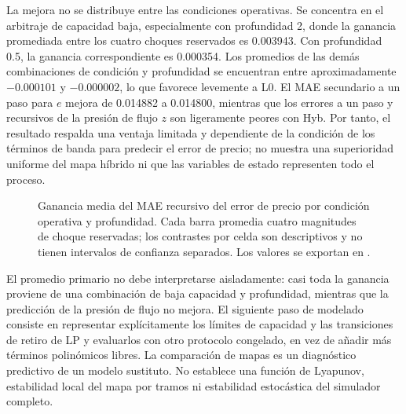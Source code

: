 La mejora no se distribuye entre las condiciones operativas. Se concentra en el arbitraje de capacidad baja, especialmente con profundidad 2, donde la ganancia promediada entre los cuatro choques reservados es 0.003943. Con profundidad 0.5, la ganancia correspondiente es 0.000354. Los promedios de las demás combinaciones de condición y profundidad se encuentran entre aproximadamente $-0.000101$ y $-0.000002$, lo que favorece levemente a L0. El MAE secundario a un paso para $e$ mejora de 0.014882 a 0.014800, mientras que los errores a un paso y recursivos de la presión de flujo $z$ son ligeramente peores con Hyb. Por tanto, el resultado respalda una ventaja limitada y dependiente de la condición de los términos de banda para predecir el error de precio; no muestra una superioridad uniforme del mapa híbrido ni que las variables de estado representen todo el proceso.

\begin{figure}[H]
\centering
{}
\caption{Ganancia media del MAE recursivo del error de precio por condición operativa y profundidad. Cada barra promedia cuatro magnitudes de choque reservadas; los contrastes por celda son descriptivos y no tienen intervalos de confianza separados. Los valores se exportan en .}
\label{fig:hybrid-cell-gains}
\end{figure}

El promedio primario no debe interpretarse aisladamente: casi toda la ganancia proviene de una combinación de baja capacidad y profundidad, mientras que la predicción de la presión de flujo no mejora. El siguiente paso de modelado consiste en representar explícitamente los límites de capacidad y las transiciones de retiro de LP y evaluarlos con otro protocolo congelado, en vez de añadir más términos polinómicos libres. La comparación de mapas es un diagnóstico predictivo de un modelo sustituto. No establece una función de Lyapunov, estabilidad local del mapa por tramos ni estabilidad estocástica del simulador completo.

